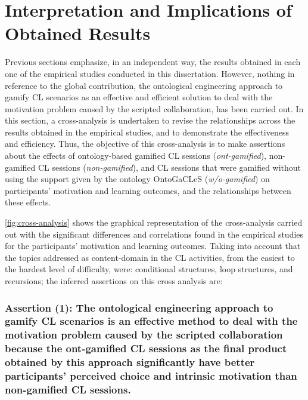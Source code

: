 \newpage
\section{Interpretation and Implications of Obtained Results}
\label{sec:interpretation-implications} 

Previous sections emphasize, in an independent way, the results obtained in each one of the empirical studies conducted in this dissertation. However, nothing in reference to the global contribution, the ontological engineering approach to gamify CL scenarios as an effective and efficient solution to deal with the motivation problem caused by the scripted collaboration, has been carried out. In this section, a cross-analysis is undertaken to revise the relationships across the results obtained in the empirical studies, and to demonstrate the effectiveness and efficiency. Thus, the objective of this cross-analysis is to make assertions about the effects of ontology-based gamified CL sessions (\emph{ont-gamified}), non-gamified CL sessions (\emph{non-gamified}), and CL sessions that were gamified without using the support given by the ontology OntoGaCLeS (\emph{w/o-gamified}) on participants' motivation and learning outcomes, and the relationships between these effects.

\autoref{fig:cross-analysis} shows the graphical representation of the cross-analysis carried out with the significant differences and correlations found in the empirical studies for the participants' motivation and learning outcomes.
Taking into account that the topics addressed as content-domain in the CL activities, from the easiest to the hardest level of difficulty, were: conditional structures, loop structures, and recursions; the inferred assertions on this cross analysis are:

\subsubsection*{Assertion (1): The ontological engineering approach to gamify CL scenarios is an effective method to deal with the motivation problem caused by the scripted collaboration because the ont-gamified CL sessions as the final product obtained by this approach significantly have better participants' perceived choice and intrinsic motivation than non-gamified CL sessions.}

